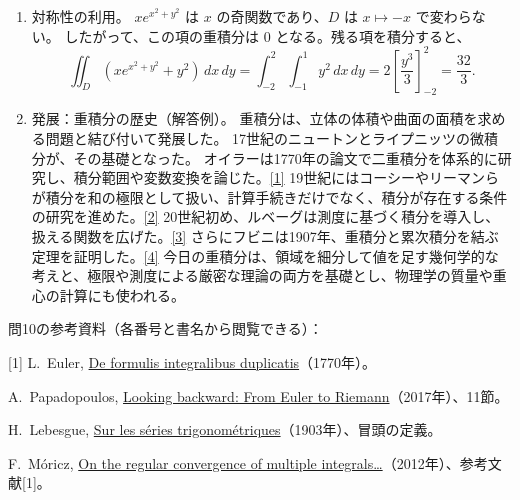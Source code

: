 \documentclass[a4paper,10pt,pdflatex,ja=standard,jafont=ipaex-type1,
  magstyle=real,scale=1]{bxjsarticle}
\newenvironment{problems}
  {\begin{enumerate}[leftmargin=2.4em,itemsep=3pt,topsep=3pt,parsep=0pt,
    font=\color{accent}]}
  {\end{enumerate}}
\newcommand{\problemlabel}[1]{{\sffamily\mdseries\color{ink}#1}}
\begin{document}
\begin{problems}
\item \problemlabel{対称性の利用。}
$xe^{x^2+y^2}$ は $x$ の奇関数であり、$D$ は $x\mapsto-x$ で変わらない。
したがって、この項の重積分は $0$ となる。残る項を積分すると、
$$
 \iint_D\left(xe^{x^2+y^2}+y^2\right)\,dx\,dy
 =\int_{-2}^2\!\int_{-1}^1y^2\,dx\,dy
 =2\left[\frac{y^3}{3}\right]_{-2}^2=\frac{32}{3}.
$$

\item \problemlabel{発展：重積分の歴史（解答例）。}
重積分は、立体の体積や曲面の面積を求める問題と結び付いて発展した。
17世紀のニュートンとライプニッツの微積分が、その基礎となった。
オイラーは1770年の論文で二重積分を体系的に研究し、積分範囲や変数変換を論じた。\href{https://scholarlycommons.pacific.edu/euler-works/391/}{[1]}
19世紀にはコーシーやリーマンらが積分を和の極限として扱い、計算手続きだけでなく、積分が存在する条件の研究を進めた。\href{https://arxiv.org/abs/1710.03982}{[2]}
20世紀初め、ルベーグは測度に基づく積分を導入し、扱える関数を広げた。\href{https://www.numdam.org/item/ASENS_1903_3_20__453_0/}{[3]}
さらにフビニは1907年、重積分と累次積分を結ぶ定理を証明した。\href{https://archive.numdam.org/articles/10.1016/j.crma.2012.03.010/}{[4]}
今日の重積分は、領域を細分して値を足す幾何学的な考えと、極限や測度による厳密な理論の両方を基礎とし、物理学の質量や重心の計算にも使われる。
\end{problems}
\par{\small\color{muted}問10の参考資料（各番号と書名から閲覧できる）：}\par
{\small\setlength{\parskip}{0pt}
[1] L.~Euler, \href{https://scholarlycommons.pacific.edu/euler-works/391/}{De formulis integralibus duplicatis}（1770年）。\par
[2] A.~Papadopoulos, \href{https://arxiv.org/abs/1710.03982}{Looking backward: From Euler to Riemann}（2017年）、11節。\par
[3] H.~Lebesgue, \href{https://www.numdam.org/item/ASENS_1903_3_20__453_0/}{Sur les s\'eries trigonom\'etriques}（1903年）、冒頭の定義。\par
[4] F.~M\'oricz, \href{https://archive.numdam.org/articles/10.1016/j.crma.2012.03.010/}{On the regular convergence of multiple integrals\ldots}（2012年）、参考文献[1]。
}\par
\end{document}
